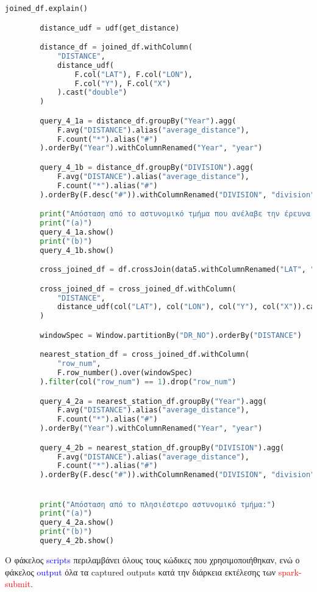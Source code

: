 \documentclass{article}
\begin{document}
\begin{lstlisting}[language = Python]
        joined_df.explain()

        distance_udf = udf(get_distance)

        distance_df = joined_df.withColumn(
            "DISTANCE",
            distance_udf(
                F.col("LAT"), F.col("LON"),
                F.col("Y"), F.col("X")
            ).cast("double")
        )

        query_4_1a = distance_df.groupBy("Year").agg(
            F.avg("DISTANCE").alias("average_distance"),
            F.count("*").alias("#")
        ).orderBy("Year").withColumnRenamed("Year", "year")

        query_4_1b = distance_df.groupBy("DIVISION").agg(
            F.avg("DISTANCE").alias("average_distance"),
            F.count("*").alias("#")
        ).orderBy(F.desc("#")).withColumnRenamed("DIVISION", "division")

        print("Απόσταση από το αστυνομικό τμήμα που ανέλαβε την έρευνα για το περιστατικό:")
        print("(a)")
        query_4_1a.show() 
        print("(b)")
        query_4_1b.show() 

        cross_joined_df = df.crossJoin(data5.withColumnRenamed("LAT", "Y").withColumnRenamed("LON", "X"))

        cross_joined_df = cross_joined_df.withColumn(
            "DISTANCE",
            distance_udf(col("LAT"), col("LON"), col("Y"), col("X")).cast("double")
        )

        windowSpec = Window.partitionBy("DR_NO").orderBy("DISTANCE")

        nearest_station_df = cross_joined_df.withColumn(
            "row_num",
            F.row_number().over(windowSpec)
        ).filter(col("row_num") == 1).drop("row_num")

        query_4_2a = nearest_station_df.groupBy("Year").agg(
            F.avg("DISTANCE").alias("average_distance"),
            F.count("*").alias("#")
        ).orderBy("Year").withColumnRenamed("Year", "year")

        query_4_2b = nearest_station_df.groupBy("DIVISION").agg(
            F.avg("DISTANCE").alias("average_distance"),
            F.count("*").alias("#")
        ).orderBy(F.desc("#")).withColumnRenamed("DIVISION", "division")


        print("Απόσταση από το πλησιέστερο αστυνομικό τμήμα:")
        print("(a)")
        query_4_2a.show()
        print("(b)")
        query_4_2b.show()

\end{lstlisting}


Ο φάκελος \textcolor{blue}{scripts} περιλαμβάνει όλους τους κώδικες που χρησιμοποιήθηκαν, ενώ ο φάκελος \textcolor{blue}{output} όλα τα captured outputs κατά την διάρκεια εκτέλεσης των \textcolor{red}{spark-submit}.
\end{document}
